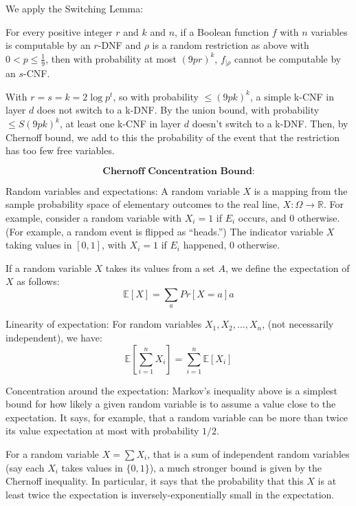 We apply the Switching Lemma:

\begin{theorem}
For every positive integer $r$ and $k$ and $n$,  
if a Boolean function $f$ with $n$ variables is computable by an $r$-DNF  
and $\rho$ is a random restriction as above with $0 < p \leq \frac{1}{9}$,  
then with probability at most $(9pr)^k$, $f_{|\rho}$ cannot be computable  
by an $s$-CNF.
\end{theorem}



With \( r = s = k = 2 \log p^t \), so with probability \( \leq (9pk)^k \), a simple k-CNF in layer \( d \) does not switch to a k-DNF.
By the union bound, with probability \( \leq S(9pk)^k \), at least one k-CNF in layer \( d \) doesn’t switch to a k-DNF.
Then, by Chernoff bound, we add to this the probability of the event that the restriction has too few free variables.

\[
\textbf{Chernoff Concentration Bound:}
\]

Random variables and expectations: A random variable \( X \) is a mapping from the sample probability space of elementary outcomes to the real line, \( X: \Omega \to \mathbb{R} \). For example, consider a random variable with \( X_i = 1 \) if \( E_i \) occurs, and \( 0 \) otherwise. (For example, a random event is flipped as “heads.”) The indicator variable \( X \) taking values in \( [0, 1] \), with \( X_i = 1 \) if \( E_i \) happened, \( 0 \) otherwise.

If a random variable \( X \) takes its values from a set \( A \), we define the expectation of \( X \) as follows:
\[
\mathbb{E}[X] = \sum_a Pr[X = a]a
\]

Linearity of expectation: For random variables \( X_1, X_2, ..., X_n \), (not necessarily independent), we have:
\[
\mathbb{E} \left[ \sum_{i=1}^{n} X_i \right] = \sum_{i=1}^{n} \mathbb{E}[X_i]
\]

Concentration around the expectation: Markov's inequality above is a simplest bound for how likely a given random variable is to assume a value close to the expectation. It says, for example, that a random variable can be more than twice its value expectation at most with probability \( 1/2 \).

For a random variable \( X = \sum X_i \), that is a sum of independent random variables (say each \( X_i \) takes values in \( \{0, 1\} \)), a much stronger bound is given by the Chernoff inequality. In particular, it says that the probability that this \( X \) is at least twice the expectation is inversely-exponentially small in the expectation.

